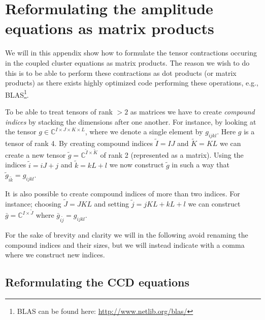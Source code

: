 \chapter{Reformulating the amplitude equations as matrix products}
    \label{app:ccsd-dot-products}
    We will in this appendix show how to formulate the tensor contractions
    occuring in the coupled cluster equations as matrix products. The reason we
    wish to do this is to be able to perform these contractions as dot products
    (or matrix products) as there exists highly optimized code performing these
    operations, e.g., BLAS\footnote{BLAS can be found here:
    \url{http://www.netlib.org/blas/}}.

    To be able to treat tensors of rank $> 2$ as matrices we have to create
    \emph{compound indices} by stacking the dimensions after one another. For
    instance, by looking at the tensor $g \in \mathbb{C}^{I \times J \times K
    \times L}$, where we denote a single element by $g_{ijkl}$. Here $g$ is a
    tensor of rank 4. By creating compound indices $\tilde{I} = IJ$ and
    $\tilde{K} = KL$ we can create a new tensor $\tilde{g} =
    \mathbb{C}^{\tilde{I} \times \tilde{K}}$ of rank 2 (represented as a
    matrix). Using the indices $\tilde{i} = iJ + j$ and $\tilde{k} = kL + l$ we
    now construct $\tilde{g}$ in such a way that $\tilde{g}_{\tilde{i}\tilde{k}}
    = g_{ijkl}$.

    It is also possible to create compound indices of more than two indices. For
    instance; choosing $\tilde{J} = JKL$ and setting $\tilde{j} = jKL + kL + l$
    we can construct $\bar{g} = \mathbb{C}^{I\times \tilde{J}}$ where
    $\bar{g}_{i\tilde{j}} = g_{ijkl}$.

    For the sake of brevity and clarity we will in the following avoid renaming
    the compound indices and their sizes, but we will instead indicate with a
    comma where we construct new indices.

    \section{Reformulating the CCD equations}

